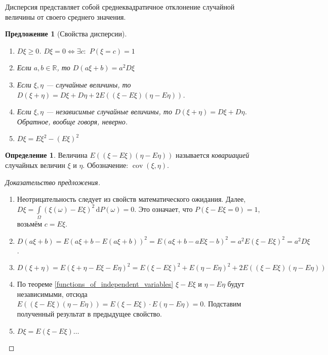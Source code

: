 \documentclass[11pt,openany,a4paper]{scrartcl}
\theoremstyle{plain}
\newtheorem{proposition}[theorem]{Предложение}
\theoremstyle{definition}
\newtheorem{definition}[theorem]{Определение}
\newcommand\mb{\mathbb}
\newcommand\real{\mb R}
\newcommand{\dif}{\, \mathrm d}
\DeclareMathOperator{\cov}{cov}
\begin{document}
Дисперсия представляет собой среднеквадратичное отклонение случайной величины
от своего среднего значения.

\begin{proposition}[Свойства дисперсии]
    \mbox{}
    \begin{enumerate}
        \item $D\xi \geqslant 0$. $D\xi = 0 \iff  \exists c:$ $P(\xi = c) = 1$
        \item Если $a, b \in \real$, то $D(a\xi + b) = a^2D\xi$
        \item Если $\xi, \eta$ — случайные величины, то $D(\xi + \eta) =
        D\xi + D\eta + 2E((\xi - E\xi)(\eta - E\eta))$.
        \item Если $\xi, \eta$ — независимые случайные величины, то
        $D(\xi+ \eta) = D\xi + D\eta$. Обратное, вообще говоря, неверно.
        \item $D\xi = E\xi^2 - (E\xi)^2$
    \end{enumerate}
\end{proposition}
\begin{definition}
    Величина $E((\xi - E\xi)(\eta - E\eta))$ называется \emph{ковариацией}
    случайных величин $\xi$ и $\eta$. Обозначение: $\cov(\xi, \eta)$.
\end{definition}

\begin{proof}[Доказательство предложения]
\mbox{}
    \begin{enumerate}
        \item Неотрицательность следует из свойств математического ожидания.
        Далее, $D\xi = \int\limits_\Omega(\xi(\omega) - E\xi)^2\dif P(\omega) =
        0$. Это означает, что $P(\xi - E\xi = 0) = 1$, возьмём $c = E\xi$.
        \item $D(a\xi + b) = E(a\xi + b - E(a\xi + b))^2 =
        E(a\xi + b - aE\xi - b)^2 = a^2E(\xi - E\xi)^2 = a^2D\xi$.
        \item $D(\xi + \eta) = E(\xi + \eta - E\xi - E\eta)^2 = E(\xi - E\xi)^2 +
        E(\eta - E\eta)^2 + 2E((\xi - E\xi)(\eta - E\eta))$
        \item По теореме \ref{functions_of_independent_variables} $\xi - E\xi$ и
        $\eta - E\eta$ будут независимыми, отсюда
        $E((\xi - E\xi)(\eta - E\eta)) = E(\xi - E\xi)\cdot E(\eta - E\eta) = 0$.
        Подставим полученный результат в предыдущее свойство.
        \item $D\xi = E(\xi - E\xi) \ldots$
    \end{enumerate}
\end{proof}
\end{document}
